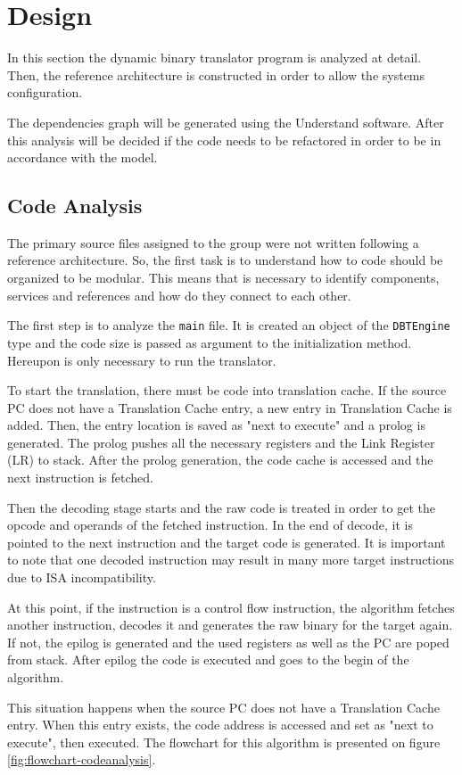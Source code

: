 \documentclass{report}
\begin{document}

\chapter{Design}

	\par In this section the dynamic binary translator program is analyzed at detail. Then, the reference architecture is constructed in order to allow the systems configuration. 
	\par The dependencies graph will be generated using the Understand software. After this analysis will be decided if the code needs to be refactored in order to be in accordance with the model. 
	
	\section{Code Analysis}
	
	\par The primary source files assigned to the group were not written following a reference architecture. So, the first task is to understand how to code should be organized to be modular. This means that is necessary to identify components, services and references and how do they connect to each other.
	\par The first step is to analyze the \texttt{main} file. It is created an object of the \texttt{DBTEngine} type and the code size is passed as argument to the initialization method. Hereupon is only necessary to run the translator.
	\par To start the translation, there must be code into translation cache. If the source PC does not have a Translation Cache entry, a new entry in Translation Cache is added. Then, the entry location is saved as "next to execute" and a prolog is generated. The prolog pushes all the necessary registers and the Link Register (LR) to stack. After the prolog generation, the code cache is accessed and the next instruction is fetched. 
	\par Then the decoding stage starts and the raw code is treated in order to get the opcode and operands of the fetched instruction. In the end of decode, it is pointed to the next instruction and the target code is generated. It is important to note that one decoded instruction may result in many more target instructions due to ISA incompatibility. 
	\par At this point, if the instruction is a control flow instruction, the algorithm fetches another instruction, decodes it and generates the raw binary for the target again. If not, the epilog is generated and the used registers as well as the PC are poped from stack. After epilog the code is executed and goes to the begin of the algorithm.
	\par This situation happens when the source PC does not have a Translation Cache entry. When this entry exists, the code address is accessed and set as "next to execute", then executed. The flowchart for this algorithm is presented on figure \ref{fig:flowchart-codeanalysis}.
	
\end{document}

